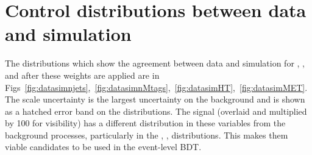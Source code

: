 









\section{Control distributions between data and simulation}


The distributions which show the agreement between data and simulation for \njets, \nMtags, \HT and \MET after these weights are applied are in Figs~\ref{fig:datasimnjets},~\ref{fig:datasimnMtags},~\ref{fig:datasimHT},~\ref{fig:datasimMET}. The scale uncertainty is the largest uncertainty on the background and is shown as a hatched error band on the distributions. The signal (overlaid and multiplied by 100 for visibility) has a different distribution in these variables from the background processes, particularly in the \njets, \nMtags, \HT distributions. This makes them viable candidates to be used in the event-level BDT.

